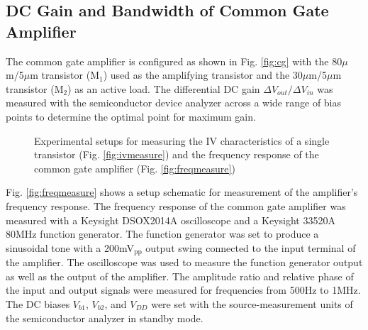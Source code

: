 \documentclass[conference]{IEEEtran}
\begin{document}
\subsection{DC Gain and Bandwidth of Common Gate Amplifier}
The common gate amplifier is configured as shown in Fig. \ref{fig:cg} with the 80$\mu$m/5$\mu$m transistor (M$_1$) used as the amplifying transistor and the 30$\mu$m/5$\mu$m transistor (M$_2$) as an active load.
The differential DC gain $\Delta V_{out}/\Delta V_{in}$ was measured with the semiconductor device analyzer across a wide range of bias points to determine the optimal point for maximum gain.

\begin{figure}[htbp]
    \centering
    \quad
    \caption{Experimental setups for measuring the IV characteristics of a single transistor (Fig. \ref{fig:ivmeasure}) and the frequency response of the common gate amplifier (Fig. \ref{fig:freqmeasure})}
    \label{fig:measurementsetup}
\end{figure}

Fig. \ref{fig:freqmeasure} shows a setup schematic for measurement of the amplifier's frequency response.
The frequency response of the common gate amplifier was measured with a Keysight DSOX2014A oscilloscope and a Keysight 33520A 80MHz function generator.
The function generator was set to produce a sinusoidal tone with a 200mV$_{\text{pp}}$ output swing connected to the input terminal of the amplifier.
The oscilloscope was used to measure the function generator output as well as the output of the amplifier.
The amplitude ratio and relative phase of the input and output signals were measured for frequencies from 500Hz to 1MHz.
The DC biases $V_{b1}$, $V_{b2}$, and $V_{DD}$ were set with the source-measurement units of the semiconductor analyzer in standby mode.
\end{document}
